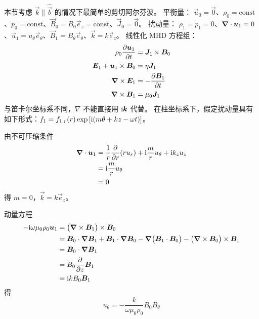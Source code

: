 本节考虑 $\vec{k}\parallel\hat{\vec{b}}$ 的情况下最简单的剪切阿尔芬波。
平衡量：
$\vec{u}_0 = \vec{0}$、$\rho_0 = \text{const}$、$p_0 = \text{const}$、$\vec{B}_0 = B_0 \vec{e}_z = \text{const}$、$\vec{J}_0 = \vec{0} $。
扰动量：
$\rho_1 = p_1 = 0$、$\bm{\nabla} \cdot{\bm{u}_1} = 0$、$\vec{u}_1 = u_\theta \vec{e}_\theta$、$\vec{B}_1 = B_\theta \vec{e}_\theta$、$\vec{k} = k \vec{e}_z $。
线性化 MHD 方程组：
\begin{subequations}\begin{align}
\rho_0 \pdv{\bm{u}_1}{t} &= \bm{J}_1 \times \bm{B}_0 \\
\bm{E}_1 + \bm{u}_1 \times \bm{B}_0 &= \eta \bm{J}_1 \\
\bm{\nabla} \times{\bm{E}_1} &= - \pdv{\bm{B}_1}{t} \\
\bm{\nabla} \times{\bm{B}_1} &= \mu_0 \bm{J}_1
\end{align}\end{subequations}
与笛卡尔坐标系不同，$\nabla$ 不能直接用 $\mathrm{i}\bm{k}$ 代替。
在柱坐标系下，假定扰动量具有如下形式：$f_1 = f_{1,r}(r) \exp{[\mathrm{i}(m \theta + k z - \omega t)]}$。

由不可压缩条件
\begin{equation}\begin{aligned}
\bm{\nabla} \cdot{\bm{u}_1} &= \frac{1}{r} \pdv{}{r}(r u_r) + \mathrm{i} \frac{m}{r} u_\theta + \mathrm{i} k_z u_z \\
&= \mathrm{i} \frac{m}{r} u_\theta \\
&= 0
\end{aligned}\end{equation}
得 $m = 0$，$\vec{k} = k \vec{e}_z$。

动量方程
\begin{equation}\begin{aligned}
- \mathrm{i} \omega \mu_0 \rho_0 \bm{u}_1 &=
\big( \bm{\nabla} \times{\bm{B}_1} \big) \times \bm{B}_0 \\
&= \bm{B}_0 \cdot \bm{\nabla}{\bm{B}_1}
+ \bm{B}_1 \cdot \bm{\nabla}{\bm{B}_0}
- \bm{\nabla}{\big(\bm{B}_1 \cdot \bm{B}_0\big)}
- \big( \bm{\nabla} \times{\bm{B}_0} \big) \times \bm{B}_1 \\
&= \bm{B}_0 \cdot \bm{\nabla}{\bm{B}_1} \\
&= B_0 \pdv{}{z} \bm{B}_1 \\
&= \mathrm{i} k B_0 \bm{B}_1
\end{aligned}\end{equation}
得
\begin{equation}
u_\theta = - \frac{k}{\omega \mu_0 \rho_0} B_0 B_\theta
\end{equation}

